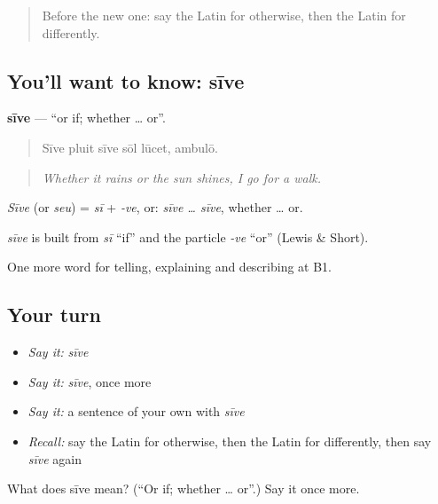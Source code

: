 \label{lesson:LA-C391-sive}



\begin{quote}
Before the new one: say the Latin for otherwise, then the Latin for differently.
\end{quote}

\subsection*{You'll want to know: sīve}
\textbf{sīve} — \textquotedblleft{}or if; whether … or\textquotedblright{}.

\begin{quote}
Sīve pluit sīve sōl lūcet, ambulō.
\end{quote}

\begin{quote}
\emph{Whether it rains or the sun shines, I go for a walk.}
\end{quote}

\emph{Sīve} (or \emph{seu}) = \emph{sī} + \emph{-ve}, or: \emph{sīve … sīve}, whether … or.

\begin{cousinweb}
\emph{sīve} is built from \emph{sī} \textquotedblleft{}if\textquotedblright{} and the particle \emph{-ve} \textquotedblleft{}or\textquotedblright{} (Lewis \& Short).
\end{cousinweb}

\begin{grammarlens}[title={What you've built}]
One more word for telling, explaining and describing at B1.
\end{grammarlens}

\subsection*{Your turn}
\begin{itemize}
\raggedright
  \item \emph{Say it:} \emph{sīve}
  \item \emph{Say it:} \emph{sīve}, once more
  \item \emph{Say it:} a sentence of your own with \emph{sīve}
  \item \emph{Recall:} say the Latin for otherwise, then the Latin for differently, then say \emph{sīve} again
\end{itemize}

\begin{tcolorbox}[breakable,colback=teal!4,colframe=teal!35!black,title={Before you move on}]
What does sīve mean? (\textquotedblleft{}Or if; whether … or\textquotedblright{}.) Say it once more.
\end{tcolorbox}
